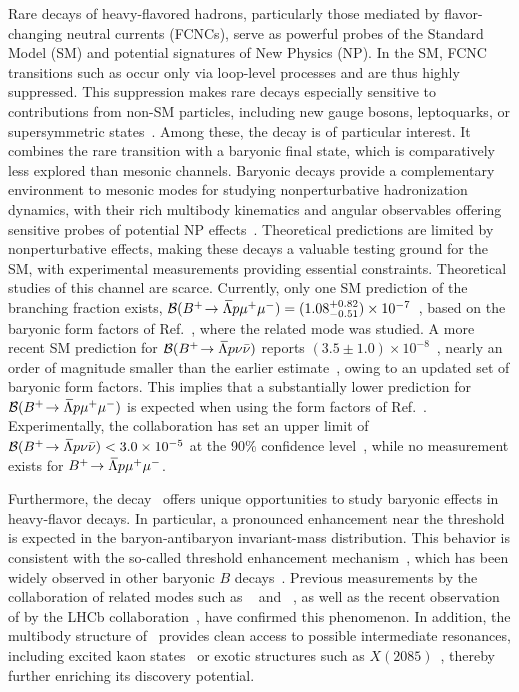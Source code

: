 Rare decays of heavy-flavored hadrons, particularly those mediated by flavor-changing neutral currents (FCNCs), serve as powerful probes of the Standard Model (SM) and potential signatures of New Physics (NP). In the SM, FCNC transitions such as \btsll occur only via loop-level processes and are thus highly suppressed. This suppression makes rare decays especially sensitive to contributions from non-SM particles, including new gauge bosons, leptoquarks, or supersymmetric states~\cite{Buchalla:1996vs,Buras:2003jf,Heeck:2014zfa,Langacker:2008yv,Buchmuller:1986zs,Becirevic:2017jtw,Gabbiani:1996hi,Buras:2000dm}. Among these, the decay \btlpmm is of particular interest. It combines the rare \btsll transition with a baryonic final state, which is  comparatively less explored than mesonic channels. Baryonic decays provide a complementary environment to mesonic modes for studying nonperturbative hadronization dynamics, with their rich multibody kinematics and angular observables offering sensitive probes of potential NP effects~\cite{Suzuki:2002cp}. Theoretical predictions are limited by nonperturbative effects, making these decays a valuable testing ground for the SM, with experimental measurements providing essential constraints. Theoretical studies of this channel are scarce. Currently, only one SM prediction of the branching fraction exists, ${\cal B}(\mbox{\ensuremath{B^{+}\!\rightarrow {\ensuremath{\kern 0.18em\overline{\kern -0.18em \Lambda}}} p \mu^{+} \mu^{-}}}) = (1.08^{+0.82}_{-0.51}) \times 10^{-7}$~\cite{Dutta:2014yta}, based on the baryonic form factors of Ref.~\cite{Geng:2012qn}, where the related mode \decay{\Bp}{\lamp \nu \bar \nu} was studied. A more recent SM prediction for ${\cal B}(\mbox{\ensuremath{{{{B}^+}}\!\rightarrow {\ensuremath{\kern 0.18em\overline{\kern -0.18em \Lambda}}} p \nu \bar \nu}})$ reports $(3.5 \pm 1.0)\times 10^{-8}$~\cite{Hsiao:2022uzx}, nearly an order of magnitude smaller than the earlier estimate~\cite{Geng:2012qn}, owing to an updated set of baryonic form factors. This implies that a substantially lower prediction for ${\cal B}(\mbox{\ensuremath{B^{+}\!\rightarrow {\ensuremath{\kern 0.18em\overline{\kern -0.18em \Lambda}}} p \mu^{+} \mu^{-}}})$ is expected when using the form factors of Ref.~\cite{Hsiao:2022uzx}. Experimentally, the \babar collaboration has set an upper limit of ${\cal B}(\mbox{\ensuremath{{{{B}^+}}\!\rightarrow {\ensuremath{\kern 0.18em\overline{\kern -0.18em \Lambda}}} p\nu\bar\nu}}) < 3.0 \times 10^{-5}$ at the 90\% confidence level~\cite{BaBar:2019awu}, while no measurement exists for $\mbox{\ensuremath{B^{+}\!\rightarrow {\ensuremath{\kern 0.18em\overline{\kern -0.18em \Lambda}}} p \mu^{+} \mu^{-}}}$.

Furthermore, the decay \btlpmm\ offers unique opportunities to study baryonic effects in heavy-flavor decays. In particular, a pronounced enhancement near the \lamp threshold is expected in the baryon-antibaryon invariant-mass distribution. This behavior is consistent with the so-called threshold enhancement mechanism~\cite{Hou:2000bz,BaBar:2014omp}, which has been widely observed in other baryonic $B$ decays~\cite{Belle:2003pwf,LHCb-PAPER-2017-005}. Previous measurements by the \belle collaboration of related modes such as \btlpkk~\cite{Belle:2018ies} and \btlppipi~\cite{Belle:2009ixu}, as well as the recent observation of  by the LHCb collaboration~\cite{LHCb-PAPER-2025-032}, have confirmed this phenomenon. In addition, the multibody structure of \btlpmm\ provides clean access to possible intermediate resonances, including excited kaon states~\cite{CMS:2019kbn} or exotic structures such as $X(2085)$~\cite{BESIII:2023kgz}, thereby further enriching its discovery potential.



